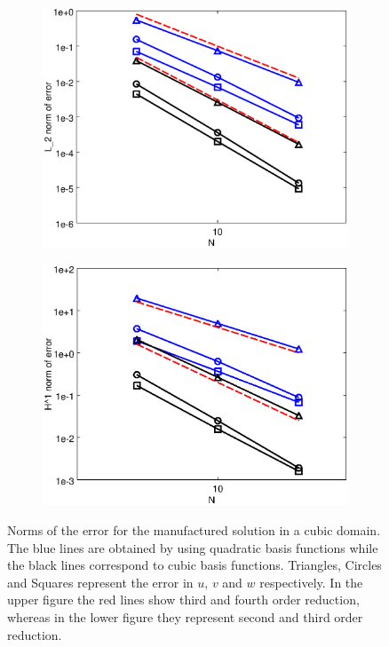 \documentclass[letter,12pt]{article}
\begin{document}
\begin{figure}
  \centering
  \begin{subfigure}{0.65\textwidth}
    \includegraphics[width=.95\linewidth,center]{box-l2.eps}
  \end{subfigure}
  \begin{subfigure}{0.65\textwidth}
    \includegraphics[width=.95\linewidth,center]{box-h1.eps}
  \end{subfigure}
  \caption{Norms of the error for the manufactured solution in a cubic
    domain. The blue lines are obtained by using quadratic basis
    functions while the black lines correspond to cubic basis
    functions. Triangles, Circles and Squares represent the error in
    $u$, $v$ and $w$ respectively. In the upper figure the red lines
    show third and fourth order reduction, whereas in the lower figure
    they represent second and third order reduction.}
  \label{fig:box}
\end{figure}
\end{document}
